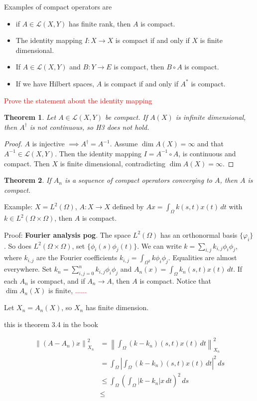 \documentclass[12pt]{article}
\newtheorem{theorem}{Theorem}[section]
\theoremstyle{definition}
\newcommand\norm[1]{\left\lVert#1\right\rVert}
\begin{document}
Examples of compact operators are 
\begin{itemize}
    \item if $A\in\mathcal{L}(X,Y)$ has finite rank, then $A$ is compact.
    \item The identity mapping $I:X\to X$ is compact if and only if $X$ is finite dimensional.
    \item If $A\in \mathcal{L}(X,Y)$ and $B:Y\to E$ is compact, then $B\circ A$ is compact.
    \item If we have Hilbert spaces, $A$ is compact if and only if $A^*$ is compact.
\end{itemize}
\textcolor{red}{Prove the statement about the identity mapping}

\begin{theorem}
    Let $A\in \mathcal{L}(X,Y)$ be compact. If $A(X)$ is infinite dimensional, then $A^\dagger $ is not continuous, so H3 does not hold.
\end{theorem}
\begin{proof}
    $A$ is injective $\implies A^\dagger =A^{-1}$. Assume $\dim A(X)=\infty$ and that $A^{-1}\in \mathcal{L}(X,Y)$. Then the identity mapping $I=A^{-1}\circ A$, is continuous and compact. Then $X$ is finite dimensional, contradicting $\dim A(X)=\infty$. 
\end{proof}

\begin{theorem}
    If $A_n$ is a sequence of compact operators converging to $A$, then $A$ is compact.
\end{theorem}

Example: $X=L^2(\Omega)$, $A:X\to X$ defined by $Ax=\int_\Omega k(s,t)x(t) \,dt$ with $k\in L^2(\Omega\times \Omega)$, then $A$ is compact.

Proof: \textbf{Fourier analysis pog}. The space $L^2(\Omega)$ has an orthonormal basis $\{\varphi_i\}$. So does $L^2(\Omega\times \Omega)$, set $\{\phi_i(s)\phi_j(t)\}$. We can write $k = \sum_{i,j} k_{i,j}\phi_i\phi_j$, where $k_{i,j}$ are the Fourier coefficients $k_{i,j} = \int_{\Omega^2}k\phi_i\phi_j$. Equalities are almost everywhere. Set $k_n = \sum_{i,j=0}^n k_{i,j}\phi_i\phi_j$ and $A_n(x) =\int_\Omega k_n(s,t)x(t)\,dt $. If each $A_n$ is compact, and if $A_n\to A$, then $A$ is compact. Notice that $\dim A_n(X)$ is finite, \textcolor{red}{......}

Let $X_n=A_n(X)$, so $X_n$ has finite dimension. 

this is theorem 3.4 in the book

\begin{equation*}
    \begin{aligned}
    \norm{(A-A_n)x}^2_{X_n} &= \norm{\int_{\Omega} (k-k_n)(s,t)x(t)\, dt}_{X_n}^2\\
                            &= \int_{\Omega} \left|  \int_{\Omega} (k-k_n)(s,t)x(t)\, dt \right|^2 \,ds\\
                            &\leq \int_\Omega \left( \int_\Omega|k-k_n|x\,dt \right)^2 \,ds\\
                            &\leq 
    \end{aligned}
\end{equation*}
\end{document}
